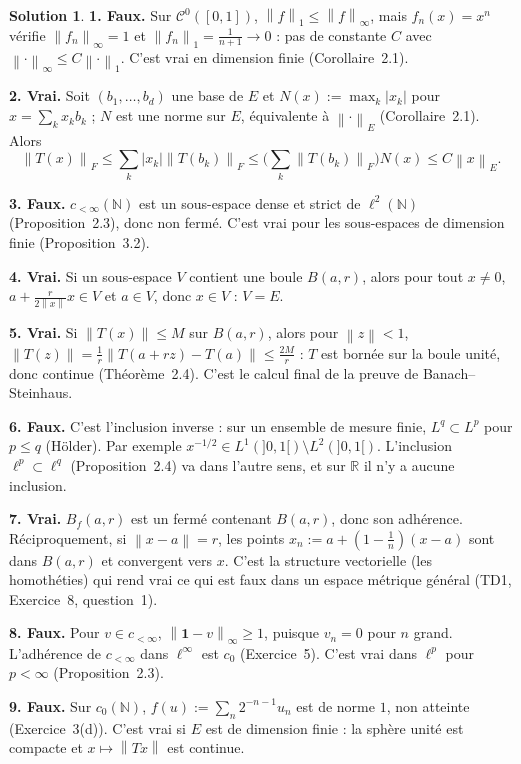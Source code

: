 \documentclass[11pt,a4paper]{article}
\newcommand{\R}{\mathbb{R}}
\newcommand{\N}{\mathbb{N}}
\newcommand{\Bf}{B_f}
\newcommand{\norm}[1]{\left\|#1\right\|}
\newcommand{\Cz}{\mathcal{C}^0}
\theoremstyle{definition}
\newtheorem*{solution}{Solution}
\begin{document}
\begin{solution}
\noindent\textbf{1. Faux.} Sur $\Cz([0,1])$, $\norm f_1\le\norm f_\infty$, mais $f_n(x)=x^n$ vérifie $\norm{f_n}_\infty=1$ et $\norm{f_n}_1=\frac1{n+1}\to0$ : pas de constante $C$ avec $\norm\cdot_\infty\le C\norm\cdot_1$. C'est vrai en dimension finie (Corollaire~2.1).

\medskip
\noindent\textbf{2. Vrai.} Soit $(b_1,\dots,b_d)$ une base de $E$ et $N(x):=\max_k|x_k|$ pour $x=\sum_kx_kb_k$ ; $N$ est une norme sur $E$, équivalente à $\norm\cdot_E$ (Corollaire~2.1). Alors
\[
\norm{T(x)}_F\le\sum_k|x_k|\norm{T(b_k)}_F\le\Big(\sum_k\norm{T(b_k)}_F\Big)N(x)\le C\norm x_E .
\]

\medskip
\noindent\textbf{3. Faux.} $c_{<\infty}(\N)$ est un sous-espace dense et strict de $\ell^2(\N)$ (Proposition~2.3), donc non fermé. C'est vrai pour les sous-espaces de dimension finie (Proposition~3.2).

\medskip
\noindent\textbf{4. Vrai.} Si un sous-espace $V$ contient une boule $B(a,r)$, alors pour tout $x\ne0$, $a+\frac r{2\norm x}x\in V$ et $a\in V$, donc $x\in V$ : $V=E$.

\medskip
\noindent\textbf{5. Vrai.} Si $\norm{T(x)}\le M$ sur $B(a,r)$, alors pour $\norm z<1$, $\norm{T(z)}=\frac1r\norm{T(a+rz)-T(a)}\le\frac{2M}r$ : $T$ est bornée sur la boule unité, donc continue (Théorème~2.4). C'est le calcul final de la preuve de Banach--Steinhaus.

\medskip
\noindent\textbf{6. Faux.} C'est l'inclusion inverse : sur un ensemble de mesure finie, $L^q\subset L^p$ pour $p\le q$ (Hölder). Par exemple $x^{-1/2}\in L^1(]0,1[)\setminus L^2(]0,1[)$. L'inclusion $\ell^p\subset\ell^q$ (Proposition~2.4) va dans l'autre sens, et sur $\R$ il n'y a aucune inclusion.

\medskip
\noindent\textbf{7. Vrai.} $\Bf(a,r)$ est un fermé contenant $B(a,r)$, donc son adhérence. Réciproquement, si $\norm{x-a}=r$, les points $x_n:=a+(1-\frac1n)(x-a)$ sont dans $B(a,r)$ et convergent vers $x$. C'est la structure vectorielle (les homothéties) qui rend vrai ce qui est faux dans un espace métrique général (TD1, Exercice~8, question~1).

\medskip
\noindent\textbf{8. Faux.} Pour $v\in c_{<\infty}$, $\norm{\mathbf 1-v}_\infty\ge1$, puisque $v_n=0$ pour $n$ grand. L'adhérence de $c_{<\infty}$ dans $\ell^\infty$ est $c_0$ (Exercice~5). C'est vrai dans $\ell^p$ pour $p<\infty$ (Proposition~2.3).

\medskip
\noindent\textbf{9. Faux.} Sur $c_0(\N)$, $f(u):=\sum_n2^{-n-1}u_n$ est de norme $1$, non atteinte (Exercice~3(d)). C'est vrai si $E$ est de dimension finie : la sphère unité est compacte et $x\mapsto\norm{Tx}$ est continue.


\end{solution}
\end{document}

